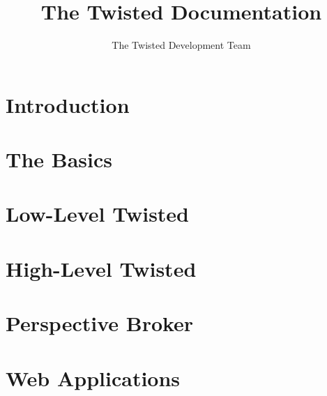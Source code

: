\documentclass[oneside]{book}
\title{The Twisted Documentation}
\author{The Twisted Development Team}
\begin{document}
\maketitle
\tableofcontents

\chapter{Introduction}











\chapter{The Basics}







\chapter{Low-Level Twisted }













\chapter{High-Level Twisted}










\chapter{Perspective Broker}







\chapter{Web Applications}





\end{document}
